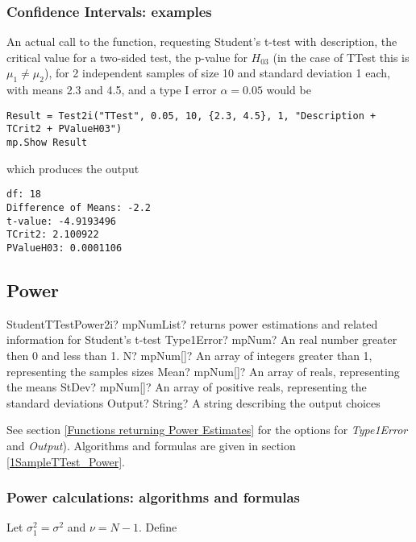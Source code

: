 

\subsubsection{Confidence Intervals: examples}
An actual call to the function, requesting Student's t-test with description, the critical value for a two-sided test, the p-value for $H_{03}$ (in the case of \textsf{TTest} this is $\mu_1 \neq \mu_2$), for 2 independent samples of size 10 and standard deviation 1 each, with means 2.3 and 4.5, and a type I error $\alpha=0.05$ would be

\begin{lstlisting}
Result = Test2i("TTest", 0.05, 10, {2.3, 4.5}, 1, "Description + TCrit2 + PValueH03")
mp.Show Result
\end{lstlisting}
which produces the output

\begin{verbatim}
df: 18
Difference of Means: -2.2
t-value: -4.9193496
TCrit2: 2.100922
PValueH03: 0.0001106
\end{verbatim}





\newpage
\subsection{Power}

\begin{mpFunctionsExtract}
	\mpFunctionFiveNotImplemented
	{StudentTTestPower2i? mpNumList? returns power estimations and related information for Student's t-test}
	{Type1Error? mpNum? An real number greater then 0 and less than 1.}
	{N? mpNum[]? An array of integers greater than 1, representing the samples sizes}
	{Mean? mpNum[]? An array of reals, representing the means}
	{StDev? mpNum[]? An array of positive reals, representing the standard deviations}
	{Output? String? A string describing the output choices}
\end{mpFunctionsExtract}

\vspace{0.3cm}
See section \ref{Functions returning Power Estimates} for the options for {\itshape\sffamily Type1Error} and {\itshape\sffamily Output}). Algorithms and formulas are given in section \ref{1SampleTTest_Power}.


\subsubsection{Power calculations: algorithms and formulas}
\label{2iSampleTTest_Power}
Let $\sigma_1^2 = \sigma^2$ and $\nu=N-1$. Define

